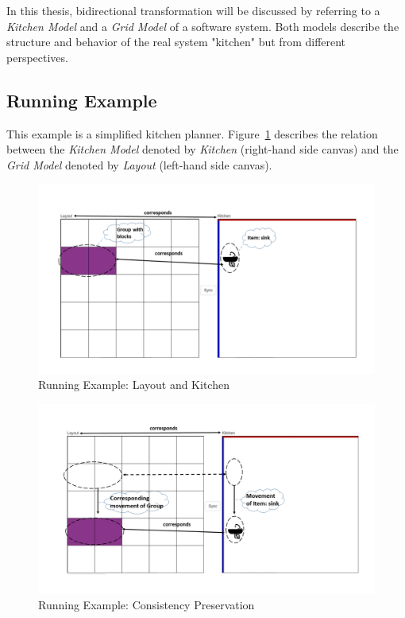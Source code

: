 In this thesis, bidirectional transformation will be discussed by referring to a \textit{Kitchen Model} and a \textit{Grid Model} of a software system. Both models describe the structure and behavior of the real system "kitchen" but from different perspectives.

\subsection{Running Example}\label{subsec:runningexample}
This example is a simplified kitchen planner. Figure~\ref{fig:Running_Example_GUI} describes the relation between the \textit{Kitchen Model} denoted by \textit{Kitchen} (right-hand side canvas) and the \textit{Grid Model} denoted by \textit{Layout} (left-hand side canvas). 

\begin{figure}[h]
	\centering
	\includegraphics[width=1\textwidth]{figures/KitchenToGrid}
	\caption{Running Example: Layout and Kitchen}
	\label{fig:Running_Example_GUI}
\end{figure} 

\begin{figure}[h]
	\centering
	\includegraphics[width=1\textwidth]{figures/KitchenToGrid_consistency}
	\caption{Running Example: Consistency Preservation}
	\label{fig:Running_Example_GUI_consistency}
\end{figure}

